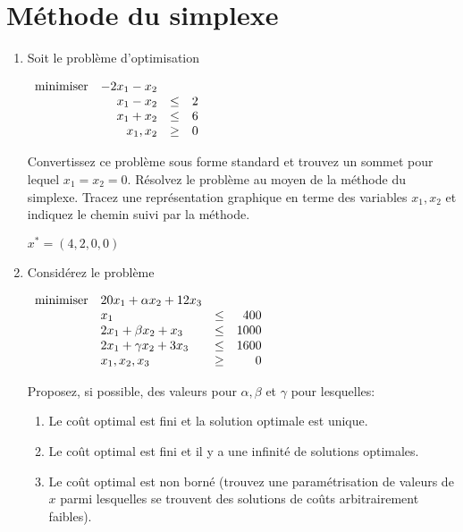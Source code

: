 \section{Méthode du simplexe}

\begin{enumerate}

  \item Soit le problème d'optimisation

    $
    \begin{array}{lrcr}
      \mbox{minimiser} & -2x_1 - x_2 \\
      & x_1 - x_2 & \leq & 2\\
      & x_1 +  x_2 & \leq & 6\\
      & x_1, x_2 & \geq & 0
    \end{array}
    $

    Convertissez ce problème sous forme standard et trouvez un sommet pour lequel $x_1 =x_2=0$. Résolvez le problème au moyen de la méthode
    du simplexe. Tracez une représentation graphique en terme des variables $x_1, x_2$ et indiquez le chemin suivi par la méthode.

    \begin{solution}
      $x^{*} = (4,2,0,0)$
    \end{solution}

  \item Considérez le problème



    $
    \begin{array}{llcr}
      \mbox{minimiser} & 20 x_1+\alpha x_2+12 x_3\\
      & x_1  & \leq & 400\\
      &2x_1+\beta x_2+x_3 & \leq & 1000\\
      &2x_1+\gamma x_2+ 3x_3 & \leq & 1600\\
      & x_1, x_2, x_3 & \geq & 0
    \end{array}
    $

    Proposez, si possible, des valeurs pour $\alpha, \beta$ et $\gamma$ pour lesquelles:

    \begin{enumerate}

      \item Le coût optimal est fini et la solution optimale est unique.

      \item Le coût optimal est fini et il y a une infinité de solutions optimales.

      \item Le coût optimal est non borné (trouvez une paramétrisation de valeurs de $x$ parmi lesquelles se trouvent des solutions de coûts
        arbitrairement faibles).


\end{enumerate}
\end{enumerate}
